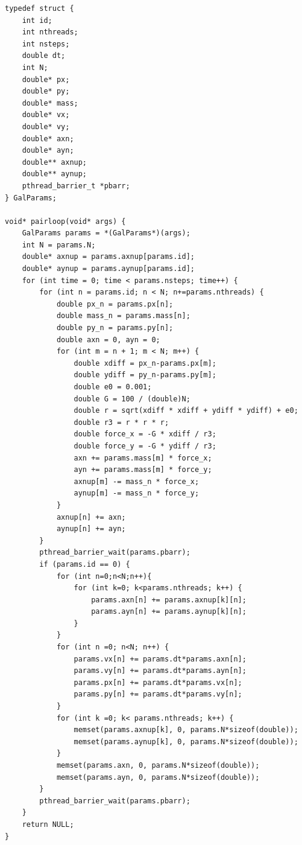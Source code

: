 \documentclass[11pt,a4paper]{article}
\begin{document}
\begin{lstlisting}[caption={Pthreads Parallelization}]
typedef struct {
    int id;
    int nthreads;
    int nsteps;
    double dt;
    int N;
    double* px;
    double* py;
    double* mass;
    double* vx;
    double* vy;
    double* axn;
    double* ayn;
    double** axnup;
    double** aynup;
    pthread_barrier_t *pbarr;
} GalParams;

void* pairloop(void* args) {
    GalParams params = *(GalParams*)(args);
    int N = params.N;
    double* axnup = params.axnup[params.id];
    double* aynup = params.aynup[params.id];
    for (int time = 0; time < params.nsteps; time++) {
        for (int n = params.id; n < N; n+=params.nthreads) {
            double px_n = params.px[n];
            double mass_n = params.mass[n];
            double py_n = params.py[n];
            double axn = 0, ayn = 0;
            for (int m = n + 1; m < N; m++) {
                double xdiff = px_n-params.px[m];
                double ydiff = py_n-params.py[m];
                double e0 = 0.001;
                double G = 100 / (double)N;
                double r = sqrt(xdiff * xdiff + ydiff * ydiff) + e0;
                double r3 = r * r * r;
                double force_x = -G * xdiff / r3;
                double force_y = -G * ydiff / r3;
                axn += params.mass[m] * force_x;
                ayn += params.mass[m] * force_y;
                axnup[m] -= mass_n * force_x;
                aynup[m] -= mass_n * force_y;
            }
            axnup[n] += axn;
            aynup[n] += ayn;
        }
        pthread_barrier_wait(params.pbarr);
        if (params.id == 0) {
            for (int n=0;n<N;n++){
                for (int k=0; k<params.nthreads; k++) {
                    params.axn[n] += params.axnup[k][n];
                    params.ayn[n] += params.aynup[k][n];
                }
            }
            for (int n =0; n<N; n++) {
                params.vx[n] += params.dt*params.axn[n];
                params.vy[n] += params.dt*params.ayn[n];
                params.px[n] += params.dt*params.vx[n];
                params.py[n] += params.dt*params.vy[n];
            }
            for (int k =0; k< params.nthreads; k++) {
                memset(params.axnup[k], 0, params.N*sizeof(double));
                memset(params.aynup[k], 0, params.N*sizeof(double));
            }
            memset(params.axn, 0, params.N*sizeof(double));
            memset(params.ayn, 0, params.N*sizeof(double));
        }
        pthread_barrier_wait(params.pbarr);
    }
    return NULL;
}
\end{lstlisting}
\end{document}
